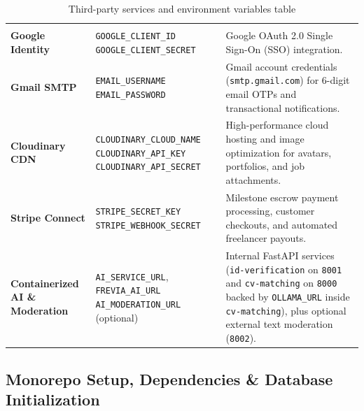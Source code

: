 \renewcommand{\arraystretch}{1.45}
\setlength{\tabcolsep}{5pt}
\begin{longtable}{|L{3.0cm}|L{4.4cm}|L{7.4cm}|}
\caption{Third-party services and environment variables table}\label{tab:third_party_env} \\
\hline
{} &  &  \\ \hline
\endfirsthead
\hline
{} &  &  \\ \hline
\endhead
\textbf{Google Identity} & \texttt{GOOGLE\_CLIENT\_ID} \newline \texttt{GOOGLE\_CLIENT\_SECRET} & Google OAuth 2.0 Single Sign-On (SSO) integration. \\ \hline
\textbf{Gmail SMTP} & \texttt{EMAIL\_USERNAME} \newline \texttt{EMAIL\_PASSWORD} & Gmail account credentials (\texttt{smtp.gmail.com}) for 6-digit email OTPs and transactional notifications. \\ \hline
\textbf{Cloudinary CDN} & \texttt{CLOUDINARY\_\allowbreak{}CLOUD\_NAME} \newline \texttt{CLOUDINARY\_\allowbreak{}API\_KEY} \newline \texttt{CLOUDINARY\_\allowbreak{}API\_SECRET} & High-performance cloud hosting and image optimization for avatars, portfolios, and job attachments. \\ \hline
\textbf{Stripe Connect} & \texttt{STRIPE\_\allowbreak{}SECRET\_KEY} \newline \texttt{STRIPE\_\allowbreak{}WEBHOOK\_SECRET} & Milestone escrow payment processing, customer checkouts, and automated freelancer payouts. \\ \hline
\textbf{Containerized AI \& Moderation} & \texttt{AI\_SERVICE\_URL}, \texttt{FREVIA\_AI\_URL} \newline \texttt{AI\_MODERATION\_URL} (optional) & Internal FastAPI services (\texttt{id-verification} on \texttt{8001} and \texttt{cv-matching} on \texttt{8000} backed by \texttt{OLLAMA\_URL} inside \texttt{cv-matching}), plus optional external text moderation (\texttt{8002}). \\ \hline
\end{longtable}

\subsection{Monorepo Setup, Dependencies \& Database Initialization}

